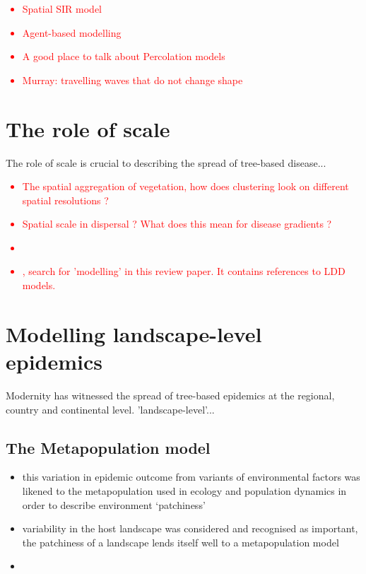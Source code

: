 \textcolor{red}{
\begin{itemize}
    \item Spatial SIR model
    \item Agent-based modelling
    \item A good place to talk about Percolation models
    \item \textcolor{red}{Murray}: travelling waves that do not change shape
\end{itemize}}

\section{The role of scale}

The role of scale is crucial to describing the spread of tree-based disease...
\textcolor{red}{
\begin{itemize}
    \item The spatial aggregation of vegetation, how does clustering look on different spatial resolutions ?
    \item Spatial scale in dispersal ? What does this mean for disease gradients ?
    \item \cite{https://doi.org/10.1111/jbi.13642}
    \item \cite{ pautasso2013european}, search for 'modelling' in this review paper. It contains references to LDD models.
\end{itemize}}

\section{Modelling landscape-level epidemics}

Modernity has witnessed the spread of tree-based epidemics at the regional, country and continental level. 'landscape-level'...

\subsection{The Metapopulation model}
\begin{itemize}
    \item this variation in epidemic outcome from variants of environmental factors was likened to the metapopulation used in ecology and population dynamics in order to describe environment `patchiness'
    \item variability in the host landscape was considered and recognised as important, the patchiness of a landscape lends itself well to a metapopulation model
    \cite{doi:10.1098/rstb.1986.0072}
    \item \cite{large-scale-control}
\end{itemize}

